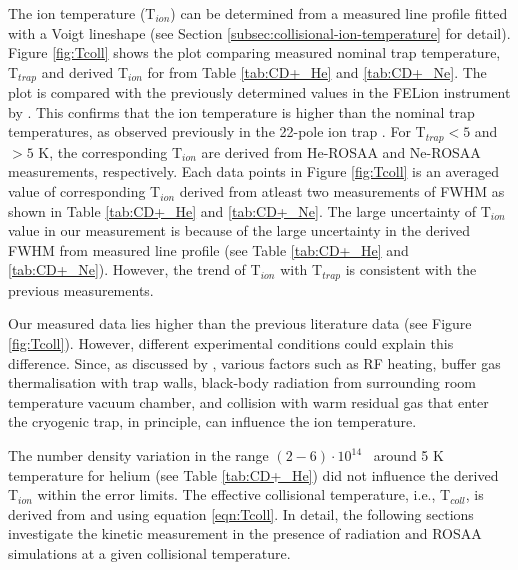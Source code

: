 The ion temperature (T$_{ion}$) can be determined from a measured line profile
fitted with a Voigt lineshape (see Section
\ref{subsec:collisional-ion-temperature} for detail). Figure \ref{fig:Tcoll}
shows the plot comparing measured nominal trap temperature, T$_{trap}$ and
derived T$_{ion}$ for \CD from Table \ref{tab:CD+_He} and \ref{tab:CD+_Ne}.
The plot is compared with the previously determined values in the FELion
instrument by \citet{kluge_state-selective_2016}. This confirms that the ion
temperature is higher than the nominal trap temperatures, as observed
previously in the 22-pole ion trap \cite{asvany_numerical_2009, otto_internal_2013, endres_incomplete_2017}. 
For T$_{trap} < 5$ and $>5$ K, the corresponding T$_{ion}$ are derived from He-ROSAA and Ne-ROSAA
measurements, respectively. Each data points in Figure \ref{fig:Tcoll} is an averaged value
of corresponding T$_{ion}$ derived from atleast two measurements of FWHM as shown in Table \ref{tab:CD+_He} 
and \ref{tab:CD+_Ne}. The large uncertainty of T$_{ion}$ value in our measurement is because of the
large uncertainty in the derived FWHM from measured line profile (see Table \ref{tab:CD+_He} and \ref{tab:CD+_Ne}).
However, the trend of T$_{ion}$ with T$_{trap}$ is consistent with the previous measurements.


Our measured \Tion data lies higher than the previous literature data (see Figure \ref{fig:Tcoll}). However, different experimental conditions could explain this difference. Since, as discussed by \citet{endres_incomplete_2017}, various factors such as RF heating, buffer gas thermalisation with trap walls, black-body radiation from surrounding room temperature vacuum chamber, and collision with warm residual gas that enter the cryogenic trap, in principle, can influence the ion temperature.

The number density variation in the range $(2-6) \cdot 10^{14}$ \percc\ around 5 K temperature
for helium (see Table \ref{tab:CD+_He}) did not influence the derived T$_{ion}$
within the error limits. The effective collisional temperature, i.e., T$_{coll}$, is derived from \Ttrap
and \Tion using equation \ref{eqn:Tcoll}. In detail, the following sections
investigate the kinetic measurement in the presence of radiation and ROSAA
simulations at a given collisional temperature.


